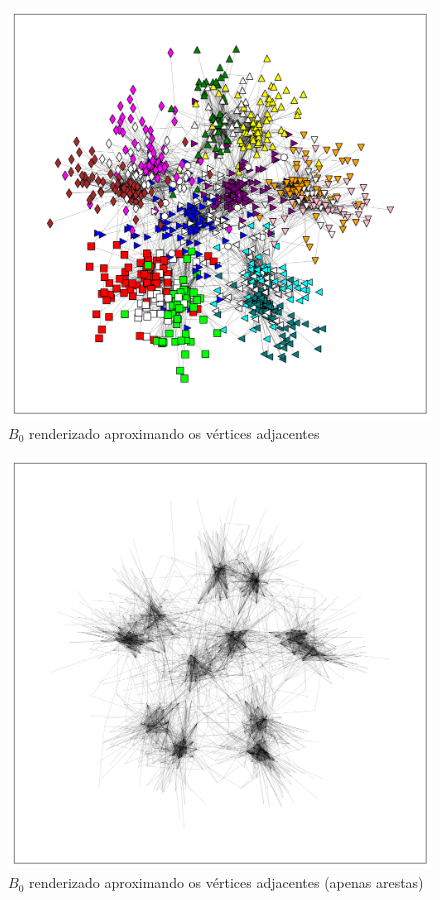 \documentclass[notes.tex]{subfiles}
\begin{document}
\begin{figure}[htpb]
    \centering
    \caption{$B_0$ renderizado aproximando os vértices adjacentes}\label{fig:b0}
    \includegraphics[width=\textwidth, height=0.42\textheight]{figures/b0.png}
\end{figure}

\begin{figure}[htpb]
    \centering
    \caption{$B_0$ renderizado aproximando os vértices adjacentes (apenas arestas)}\label{fig:b0_wires}
    \includegraphics[width=1\textwidth, height=0.42\textheight]{figures/b0_wires.png}
\end{figure}
\end{document}
